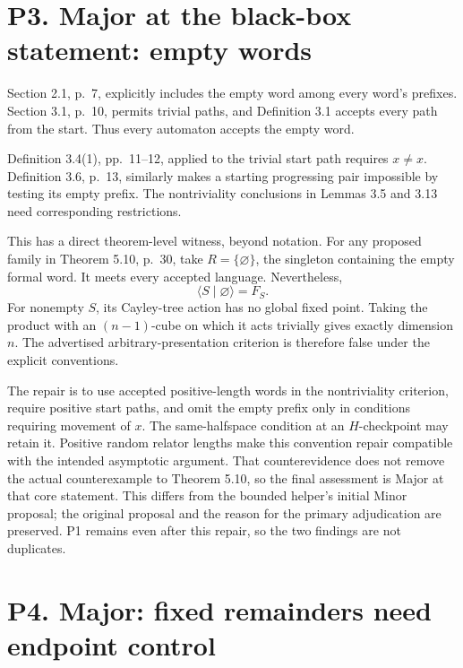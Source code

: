 \documentclass[10pt]{article}
\begin{document}
\section*{P3. Major at the black-box statement: empty words}
Section 2.1, p. 7, explicitly includes the empty word among every word’s prefixes. Section 3.1, p. 10, permits trivial paths, and Definition 3.1 accepts every path from the start. Thus every automaton accepts the empty word.\par
Definition 3.4(1), pp. 11–12, applied to the trivial start path requires \(x\ne x\). Definition 3.6, p. 13, similarly makes a starting progressing pair impossible by testing its empty prefix. The nontriviality conclusions in Lemmas 3.5 and 3.13 need corresponding restrictions.\par
This has a direct theorem-level witness, beyond notation. For any proposed family in Theorem 5.10, p. 30, take \(R=\{\varnothing\}\), the singleton containing the empty formal word. It meets every accepted language. Nevertheless, \[\langle S\mid\varnothing\rangle=F_S.\] For nonempty \(S\), its Cayley-tree action has no global fixed point. Taking the product with an \((n-1)\)-cube on which it acts trivially gives exactly dimension \(n\). The advertised arbitrary-presentation criterion is therefore false under the explicit conventions.\par
The repair is to use accepted positive-length words in the nontriviality criterion, require positive start paths, and omit the empty prefix only in conditions requiring movement of \(x\). The same-halfspace condition at an \(H\)-checkpoint may retain it. Positive random relator lengths make this convention repair compatible with the intended asymptotic argument. That counterevidence does not remove the actual counterexample to Theorem 5.10, so the final assessment is Major at that core statement. This differs from the bounded helper’s initial Minor proposal; the original proposal and the reason for the primary adjudication are preserved. P1 remains even after this repair, so the two findings are not duplicates.\par
\section*{P4. Major: fixed remainders need endpoint control}
\end{document}

